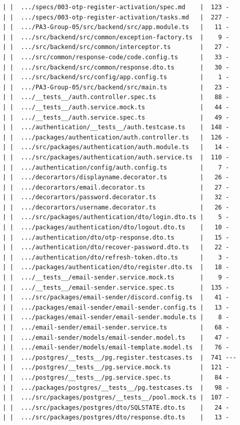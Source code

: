 \documentclass[12pt]{article}
\begin{document}
\begin{lstlisting}[numbers=none,breaklines=true]
| |  .../specs/003-otp-register-activation/spec.md    |  123 -
| |  .../specs/003-otp-register-activation/tasks.md   |  227 -
| |  .../PA3-Group-05/src/backend/src/app.module.ts   |   11 -
| |  .../src/backend/src/common/exception-factory.ts  |    9 -
| |  .../src/backend/src/common/interceptor.ts        |   27 -
| |  .../src/common/response-code/code.config.ts      |   33 -
| |  .../src/backend/src/common/response.dto.ts       |   30 -
| |  .../src/backend/src/config/app.config.ts         |    1 -
| |  .../PA3-Group-05/src/backend/src/main.ts         |   23 -
| |  .../__tests__/auth.controller.spec.ts            |   88 -
| |  .../__tests__/auth.service.mock.ts               |   44 -
| |  .../__tests__/auth.service.spec.ts               |   49 -
| |  .../authentication/__tests__/auth.testcase.ts    |  148 -
| |  .../packages/authentication/auth.controller.ts   |  126 -
| |  .../src/packages/authentication/auth.module.ts   |   14 -
| |  .../src/packages/authentication/auth.service.ts  |  110 -
| |  .../authentication/config/auth.config.ts         |    7 -
| |  .../decorartors/displayname.decorator.ts         |   26 -
| |  .../decorartors/email.decorator.ts               |   27 -
| |  .../decorartors/password.decorator.ts            |   32 -
| |  .../decorartors/username.decorator.ts            |   26 -
| |  .../src/packages/authentication/dto/login.dto.ts |    5 -
| |  .../packages/authentication/dto/logout.dto.ts    |   10 -
| |  .../authentication/dto/otp-response.dto.ts       |   15 -
| |  .../authentication/dto/recover-password.dto.ts   |   22 -
| |  .../authentication/dto/refresh-token.dto.ts      |    3 -
| |  .../packages/authentication/dto/register.dto.ts  |   18 -
| |  .../__tests__/email-sender.service.mock.ts       |    9 -
| |  .../__tests__/email-sender.service.spec.ts       |  135 -
| |  .../src/packages/email-sender/discord.config.ts  |   41 -
| |  .../packages/email-sender/email-sender.config.ts |   13 -
| |  .../packages/email-sender/email-sender.module.ts |    8 -
| |  .../email-sender/email-sender.service.ts         |   68 -
| |  .../email-sender/models/email-sender.model.ts    |   47 -
| |  .../email-sender/models/email-template.model.ts  |   76 -
| |  .../postgres/__tests__/pg.register.testcases.ts  |  741 ---
| |  .../postgres/__tests__/pg.service.mock.ts        |  121 -
| |  .../postgres/__tests__/pg.service.spec.ts        |   84 -
| |  .../packages/postgres/__tests__/pg.testcases.ts  |   98 -
| |  .../src/packages/postgres/__tests__/pool.mock.ts |  107 -
| |  .../src/packages/postgres/dto/SQLSTATE.dto.ts    |   24 -
| |  .../src/packages/postgres/dto/response.dto.ts    |   13 -

\end{lstlisting}
\end{document}
